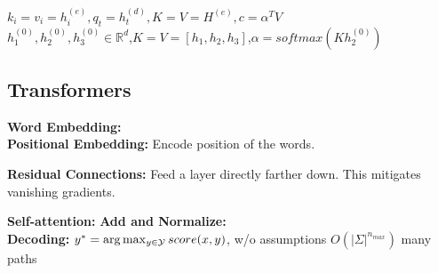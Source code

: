 $k_i = v_i = h_i^{(e)}, q_t = h_t^{(d)}, K = V = H^{(e)}, c = \alpha^T V$\\
$h_1^{(0)},h_2^{(0)},h_3^{(0)} \in \mathbb{R}^d$,$K=V=[h_1,h_2,h_3]$,$\alpha = softmax(K h_2^{(0)})$\\


\subsection{Transformers}
\begin{comment}
	Transformers are NN's whose architecture is based on RNN transformers. The main advantage is that it is parallelizable, compared to the sequential running RNNs.\\
\end{comment}
\textbf{Word Embedding:}\\
\textbf{Positional Embedding:} Encode position of the words.\\
\begin{comment}
	Transformers don't use a recurrent structure and therefore need a way to encode the word position. How important this is, is a different question.\\
\end{comment}

\textbf{Residual Connections:} Feed a layer directly farther down. This mitigates vanishing gradients.\\
\begin{comment}
	\textbf{Layer Normalization:} Instead of doing batch normalization, normalize inputs of the layer. The input of the layers change as the parameters of the previous layer change, this can lead to a covariance shift with cascading effect.\\
\end{comment}

\textbf{Self-attention:} \textbf{Add and Normalize:}\\

\textbf{Decoding:} $y^* = \arg\max_{y \in \mathcal{Y}} score(x,y)$, w/o assumptions $O(|\Sigma|^{n_{max}})$ many paths\\
\begin{comment}
	We must choose $y_t$ with maximum likelihood at each step.\\
	Can be interpreted as a graph search problem. In this instance, the outputs depend on all previous outputs, we do not make any independence assumptions.\\
	This leads to every an explosion of the graph node, since every element of the vocabulary needs a connection to every element of the vocabulary at every step of the sequence $\Rightarrow O(|\Sigma|^{n_{max}})$.\\
\end{comment} 

